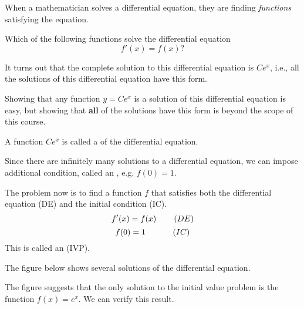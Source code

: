\documentclass{ximera}
\begin{document}
When a mathematician solves a differential equation, they are finding
\textit{functions} satisfying the equation.
\begin{question}
  Which of the following functions solve the differential equation
  \[
  f'(x) = f(x)?
  \]
  \begin{selectAll}
  \end{selectAll}
  \begin{feedback}
    It turns out that the complete solution to this differential equation
    is $Ce^x$, i.e., all the solutions of this differential equation have this form. 
    
    Showing that any function $y=Ce^x$ is a solution of this  differential equation is easy, but showing that \textbf{all} of the solutions have this form is beyond the scope of this course.  
    
      A function $Ce^x$ is called a  of the differential equation. 
      
   Since there are infinitely many solutions to a differential equation, we can impose additional condition, called an , e.g. $f(0)=1$.
   
   
   The problem now is to find a function $f$ that satisfies both the differential equation (DE) and the initial condition (IC).
     \[
  f'(x) = f(x) \hspace{0.3in}(DE)  
   \]  
  \[
  f(0) =1   \hspace{0.46in}(IC)  
  \]
   This is called an  (IVP). 
      
   The figure below shows several solutions of the differential equation. 
     \begin{image}
\end{image}
The figure suggests that the only solution to the initial value problem is the function $f(x)=e^x$.
We can verify this result.


\end{feedback}
\end{question}
\end{document}
